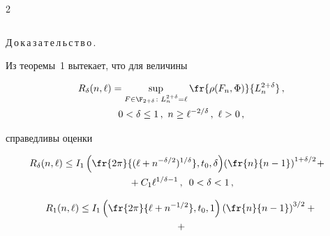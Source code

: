 \begin{multicols}{2}
{\begin{center}
\begin{tabular}{|c|c|}
\hline


\end{tabular}


\end{center}


}




\vspace*{6pt}








\bigskip


\addtocounter{table}{1}





\noindent


Д\,о\,к\,а\,з\,а\,т\,е\,л\,ь\,с\,т\,в\,о\,.\


Из теоремы~1 вытекает, что для величины


\begin{multline*}


R_\delta(n,\ell)=\sup_{F\in\F_{2+\delta}\colon L_n^{2+\delta}=\ell}


\fr{\rho(F_n,\Phi)}{L_n^{2+\delta}}\,,\\


 0<\delta\le1\,,\ n\ge\ell^{-2/\delta}\,,\


\ell >0\,,


\end{multline*}


справедливы оценки


\begin{multline*}


\!\!\!\!R_\delta(n,\ell)\le


I_1\left(\fr{2\pi}{(\ell+n^{-\delta/2})^{1/\delta}},t_0,\delta\right)\!


\left(\fr{n}{n-1}\right)^{1+\delta/2}\! +{}\\


{}+C_1\ell^{1/\delta-1}\,,\enskip 0<\delta<1\,,


\end{multline*}


\begin{multline*}


R_1(n,\ell)\le I_1\left(\fr{2\pi}{\ell+n^{-1/2}},t_0,1\right)


\left(\fr{n}{n-1}\right)^{3/2} +{}\\


{}+



\end{multline*}
\end{multicols}
